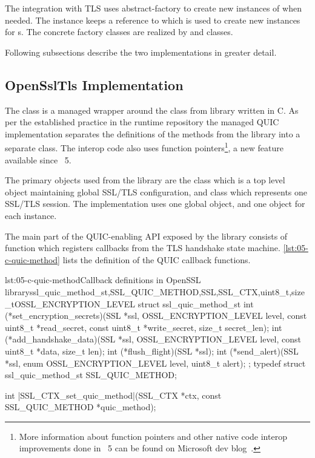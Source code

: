The integration with TLS uses \gls{abstract-factory} to create new instances of \ITls{} when needed.
The \ManagedQuicImplementationProvider{} instance keeps a reference to \QuicTlsProvider{} which is
used to create new \ITls{} instances for \ManagedQuicConnection{}s. The concrete factory classes are
realized by \OpenSslQuicTlsProvider{} and \MockQuicTlsProvider{} classes.

Following subsections describe the two \ITls{} implementations in greater detail.

\subsection{OpenSslTls Implementation}

The \OpenSslTls{} class is a managed wrapper around the \SSL{} class from \libopenssl{} library
written in C. As per the established practice in the \dotnet{} runtime repository the managed QUIC
implementation separates the definitions of the  methods from the \libopenssl{}
library into a separate  class. The interop code also uses \csharp{}
function pointers\footnote{More information about \csharp{} function pointers and other native code
  interop improvements done in \dotnet{}~5 can be found on Microsoft dev
  blog~\cite{dotnet5interopimprovements}.}, a new feature available since \dotnet{}~5.

The primary objects used from the \libopenssl{} library are the \SSLCTX{} class which is a top level
object maintaining global SSL/TLS configuration, and \SSL{} class which represents one SSL/TLS
session. The \OpenSslTls{} implementation uses one global \SSLCTX{} object, and one \SSL{}
object for each \OpenSslTls{} instance.

The main part of the QUIC-enabling API exposed by the \libopenssl{} library consists of
 function which registers callbacks from the TLS handshake state
machine. \autoref{lst:05-c-quic-method} lists the definition of the \libopenssl{} QUIC callback
functions.


\begin{myListingC}{lst:05-c-quic-method}{Callback definitions in OpenSSL library}{ssl_quic_method_st,SSL_QUIC_METHOD,SSL,SSL_CTX,uint8_t,size_t}{OSSL_ENCRYPTION_LEVEL}
struct ssl_quic_method_st {
    int (*set_encryption_secrets)(SSL *ssl, OSSL_ENCRYPTION_LEVEL level,
                                  const uint8_t *read_secret,
                                  const uint8_t *write_secret,
                                  size_t secret_len);
    int (*add_handshake_data)(SSL *ssl, OSSL_ENCRYPTION_LEVEL level,
                              const uint8_t *data, size_t len);
    int (*flush_flight)(SSL *ssl);
    int (*send_alert)(SSL *ssl, enum OSSL_ENCRYPTION_LEVEL level,
                      uint8_t alert);
};
typedef struct ssl_quic_method_st SSL_QUIC_METHOD;

int |SSL_CTX_set_quic_method|(SSL_CTX *ctx, const SSL_QUIC_METHOD *quic_method);
\end{myListingC}

